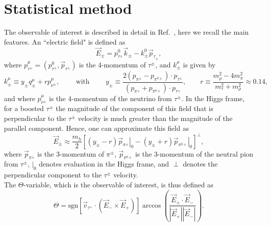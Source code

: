 \documentclass[preprintnumbers,nofootinbib,noshowpacs,eqsecnum,prd,superscriptaddress,letterpaper]{revtex4}
\begin{document}
\section{Statistical method}
\label{sec:method}

The observable of interest is described in detail in Ref.~\cite{harnik}, here we recall the main features. An ``electric field" is defined as
\begin{equation}
\vec{E}_\pm=p^0_{\tau^\pm}\vec{k}_\pm-k^0_\pm\vec{p}_{\tau_\pm},\label{eqn:electricField}
\end{equation}
where $p^\mu_{\tau^\pm}=(p^0_{\tau^\pm},\vec{p}_{\tau^\pm})$ is the 4-momentum of $\tau^\pm$, and $k_\pm^\mu$ is given by
\begin{equation}
k^\mu_\pm\equiv y_\pm q^\mu_\pm+rp^\mu_{\nu^\pm},\qquad\text{ with }\qquad y_\pm\equiv\frac{2(p_{\pi^\pm}-p_{\pi^{0\pm}})\cdot p_{\tau^\pm}}{(p_{\pi^\pm}+p_{\pi^{0\pm}})\cdot p_{\tau^\pm}},\qquad r\equiv\frac{m_\rho^2-4m_\pi^2}{m_\tau^2+m_\rho^2}\approx 0.14,\label{eqn:thetaConst}
\end{equation}
and where $p^\mu_{\nu^\pm}$ is the 4-momentum of the neutrino from $\tau^\pm$. In the Higgs frame, for a boosted $\tau^\pm$ the magnitude of the component of this field that is perpendicular to the $\tau^\pm$ velocity is much greater than the magnitude of the parallel component. Hence, one can approximate this field as
\begin{equation}
\vec{E}_\pm \approx \frac{m_h}{2}\left[(y_\pm-r)\left.\vec{p}_{\pi^\pm}\right|_0-(y_\pm+r)\left.\vec{p}_{\pi^{0\pm}}\right|_0\right]^\perp,\label{eqn:electricApprox}
\end{equation}
where $\vec{p}_{\pi^\pm}$ is the 3-momentum of $\pi^\pm$, $\vec{p}_{\pi^{0\pm}}$ is the 3-momentum of the neutral pion from $\tau^\pm$, $|_0$ denotes evaluation in the Higgs frame, and $\perp$ denotes the perpendicular component to the $\tau^\pm$ velocity.\\

The $\Theta$-variable, which is the observable of interest, is thus defined as
\begin{equation}
\Theta=\text{sgn}\left[\vec{v}_{\tau^+}\cdot(\vec{E}_-\times\vec{E}_+)\right]\arccos\left(\frac{\vec{E}_+\cdot\vec{E}_-}{|\vec{E}_+||\vec{E}_-|}\right).\label{eqn:thetaVar}
\end{equation}
\end{document}
